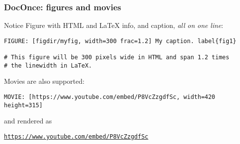 \documentclass{beamer}
\newenvironment{doconce:movie}{}{}
\newcounter{doconce:movie:counter}
\begin{document}
\begin{frame}
\frametitle{DocOnce: figures and movies}

\begin{block}{Notice}
Figure with HTML and {\LaTeX} info, and caption, \emph{all on one line}:
\end{block}






\begin{Verbatim}[numbers=none,fontsize=\fontsize{9pt}{9pt},baselinestretch=0.95]
FIGURE: [figdir/myfig, width=300 frac=1.2] My caption. label{fig1}

# This figure will be 300 pixels wide in HTML and span 1.2 times
# the linewidth in LaTeX.

\end{Verbatim}


Movies are also supported:



\begin{Verbatim}[numbers=none,fontsize=\fontsize{9pt}{9pt},baselinestretch=0.95]
MOVIE: [https://www.youtube.com/embed/P8VcZzgdfSc, width=420 height=315]

\end{Verbatim}

and rendered as


\begin{doconce:movie}
\begin{center}
\href{{https://www.youtube.com/embed/P8VcZzgdfSc}}{\nolinkurl{https://www.youtube.com/embed/P8VcZzgdfSc}}
\end{center}
\end{doconce:movie}
\end{frame}
\end{document}

